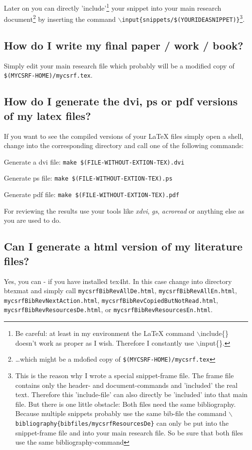 \documentclass[
  DIV=calc,
  BCOR=5mm,
  11pt,
  headings=small,
  oneside,
  abstract=true,
  toc=bib,
  ngerman,english]{scrartcl}
\begin{document}
Later on you can directly 'include'\footnote{Be careful: at least in my
environment the LaTeX command $\backslash$include\{\} doesn't work as proper as
I wish. Therefore I constantly use $\backslash$input\{\}.} your snippet into
your main research document\footnote{\ldots which might be a mdofied copy of
\texttt{\$(MYCSRF-HOME)/mycsrf.tex}} by inserting the command
\texttt{$\backslash$input\{snippets/\$(YOURIDEASNIPPET)\}}\footnote{This is the
reason why I wrote a special snippet-frame file. The frame file contains only
the header- and document-commands and 'included' the real text. Therefore this
'include-file' can also directly be 'included' into that main file. But there is
one little obstacle: Both files need the same bibliography. Because multiple
snippets probably use the same bib-file the command
\texttt{$\backslash$bibliography\{\-bibfiles/\-mycsrfResourcesDe\}} can only be
put into the snippet-frame file and into your main research file. So be sure
that both files use the same bibliography-command}.

\subsection{How do I write my final paper / work / book?}

Simply edit your main research file which probably will be a modified copy of
\texttt{\$(MYCSRF-HOME)/mycsrf.tex}. 

\subsection{How do I generate the dvi, ps or pdf versions of my latex files?}
If you want to see the compiled versions of your LaTeX files simply open a
shell, change into the corresponding directory and call one of the following
commands:

\begin{description} 
\item Generate a dvi file: \texttt{make \$(FILE-WITHOUT-EXTION-TEX).dvi}
\item Generate ps file: \texttt{make \$(FILE-WITHOUT-EXTION-TEX).ps} 
\item Generate pdf file: \texttt{make \$(FILE-WITHOUT-EXTION-TEX).pdf}
\end{description}

For reviewing the results use your tools like \textit{xdvi}, \textit{gs},
\textit{acroread} or anything else as you are used to do.

\subsection{Can I generate a html version of my literature files?}
Yes, you can - if you have installed tex4ht. In this case change into
directory btexmat and simply call \texttt{mycsrfBibRevAllDe.html}, 
\texttt{mycsrfBibRevAllEn.html}, \texttt{mycsrfBibRevNextAction.html},
\texttt{mycsrfBibRevCopiedButNotRead.html},
\texttt{mycsrfBibRevResourcesDe.html}, or
\texttt{mycsrfBibRevResourcesEn.html}.
\end{document}
